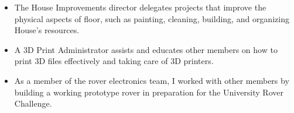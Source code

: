 


\cvtag{\LaTeX}
\divider

\divider

\divider






\begin{itemize}
    \item The House Improvements director delegates projects that improve the physical aspects of floor, such as painting, cleaning, building, and organizing House's resources.
\end{itemize}
\smallskip

\begin{itemize}
	\item A 3D Print Administrator assists and educates other members on how to print 3D files effectively and taking care of 3D printers.
\end{itemize}
\smallskip

\begin{itemize}
    \item As a member of the rover electronics team, I worked with other members by building a working prototype rover in preparation for the University Rover Challenge. 
\end{itemize}


